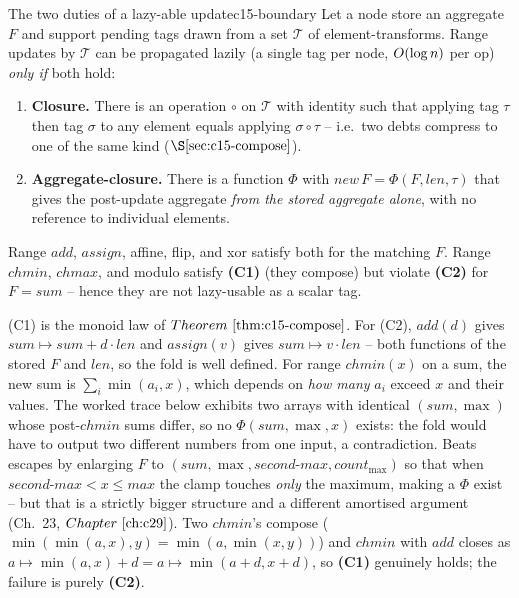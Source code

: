 \begin{proposition}{The two duties of a lazy-able update}{c15-boundary}
Let a node store an aggregate \(F\) and support pending tags drawn from a set \(\mathcal{T}\) of element-transforms.  Range updates by \(\mathcal{T}\) can be propagated lazily (a single tag per node, \(O(\log n)\) per op) \emph{only if} both hold:
\begin{enumerate}[nosep,leftmargin=1.6em]
  \item[\textbf{(C1)}] \textbf{Closure.} There is an operation \(\circ\) on \(\mathcal{T}\) with identity such that applying tag \(\tau\) then tag \(\sigma\) to any element equals applying \(\sigma\circ\tau\) -- i.e.\ two debts compress to one of the same kind (\(\secref{c15-compose}\)).
  \item[\textbf{(C2)}] \textbf{Aggregate-closure.} There is a function \(\Phi\) with \(\mathit{new}\,F=\Phi(F,\mathit{len},\tau)\) that gives the post-update aggregate \emph{from the stored aggregate alone}, with no reference to individual elements.
\end{enumerate}
Range \(\mathit{add}\), \(\mathit{assign}\), affine, flip, and xor satisfy both for the matching \(F\).  Range \(\mathit{chmin}\), \(\mathit{chmax}\), and modulo satisfy \textbf{(C1)} (they compose) but violate \textbf{(C2)} for \(F=\mathit{sum}\) -- hence they are not lazy-usable as a scalar tag.
\end{proposition}
\begin{proofbox}
(C1) is the monoid law of \(\thmref{c15-compose}\).  For (C2), \(\mathit{add}(d)\) gives \(\mathit{sum}\!\mapsto\!\mathit{sum}+d\cdot\mathit{len}\) and \(\mathit{assign}(v)\) gives \(\mathit{sum}\!\mapsto\!v\cdot\mathit{len}\) -- both functions of the stored \(F\) and \(\mathit{len}\), so the fold is well defined.  For range \(\mathit{chmin}(x)\) on a sum, the new sum is \(\sum_i\min(a_i,x)\), which depends on \emph{how many} \(a_i\) exceed \(x\) and their values.  The worked trace below exhibits two arrays with identical \((\mathit{sum},\max)\) whose post-\(\mathit{chmin}\) sums differ, so no \(\Phi(\mathit{sum},\max,x)\) exists: the fold would have to output two different numbers from one input, a contradiction.  Beats escapes by enlarging \(F\) to \((\mathit{sum},\max,\mathit{second\text{-}max},\mathit{count}_{\max})\) so that when \(\mathit{second\text{-}max}<x\le\mathit{max}\) the clamp touches \emph{only} the maximum, making a \(\Phi\) exist -- but that is a strictly bigger structure and a different amortised argument (Ch.~23, \(\chref{c29}\)).  Two \(\mathit{chmin}\)'s compose (\(\min(\min(a,x),y)=\min(a,\min(x,y))\)) and \(\mathit{chmin}\) with \(\mathit{add}\) closes as \(a\mapsto\min(a,x)+d=a\mapsto\min(a+d,x+d)\), so \textbf{(C1)} genuinely holds; the failure is purely \textbf{(C2)}.
\end{proofbox}

